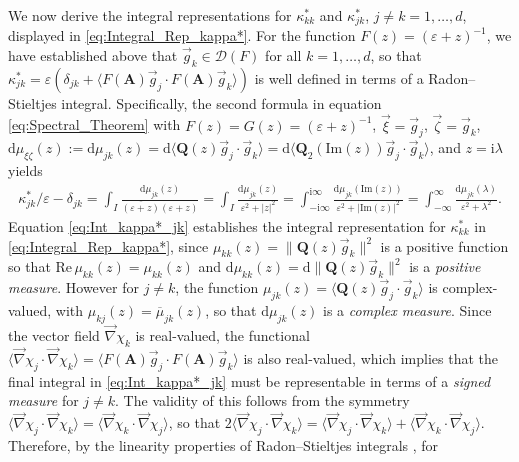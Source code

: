\documentclass[11pt]{amsart}
\newcommand{\I}{\mathrm{i}}
\renewcommand{\d}{\mathrm{d}}
\newcommand{\Ab}{\mathbf{A}}
\newcommand{\Qb}{\mathbf{Q}}
\newcommand{\Ds}{\mathscr{D}}
\begin{document}
We now derive the integral representations for $\kappa^*_{kk}$ and
$\kappa^*_{jk}$, $j\neq k=1,\ldots,d$, displayed in
\eqref{eq:Integral_Rep_kappa*}. For the function $F(z)=(\varepsilon+z)^{-1}$, we
have established above that $\vec{g}_k\in\Ds(F)$ for all
$k=1,\ldots,d$, so that
$\kappa^*_{jk}=\varepsilon(\delta_{jk}+\langle F(\Ab)\vec{g}_j\cdot F(\Ab)\vec{g}_k\rangle)$ is well defined
in terms of a Radon--Stieltjes integral. Specifically, the second
formula in equation \eqref{eq:Spectral_Theorem} with
$F(z)=G(z)=(\varepsilon+z)^{-1}$, $\vec{\xi}=\vec{g}_j$, $\vec{\zeta}=\vec{g}_k$,
$\d\mu_{\xi\zeta}(z):=\d\mu_{jk}(z)=\d\langle\Qb(z)\vec{g}_j\cdot\vec{g}_k\rangle
=\d\langle\Qb_2(\text{Im}(z))\vec{g}_j\cdot\vec{g}_k\rangle$, and $z=\I\lambda$
yields         
%
\begin{align}\label{eq:Int_kappa*_jk}
  \kappa^*_{jk}/\varepsilon-\delta_{jk}
               =\int_I\frac{\d\mu_{jk}(z)}{\overline{(\varepsilon+z)}(\varepsilon+z)}
               =\int_I\frac{\d\mu_{jk}(z)}{\varepsilon^2+|z|^2}
               =\int_{-\I\infty}^{\I\infty}\frac{\d\mu_{jk}(\text{Im}(z))}{\varepsilon^2+|\text{Im}(z)|^2}
               =\int_{-\infty}^\infty\frac{\d\mu_{jk}(\lambda)}{\varepsilon^2+\lambda^2}.
\end{align}
%
Equation \eqref{eq:Int_kappa*_jk} establishes the integral
representation for $\kappa^*_{kk}$ in \eqref{eq:Integral_Rep_kappa*}, since
$\mu_{kk}(z)=\|\Qb(z)\vec{g}_k\|^2$ is a positive function so that
$\text{Re}\,\mu_{kk}(z)=\mu_{kk}(z)$ and
$\d\mu_{kk}(z)=\d\|\Qb(z)\vec{g}_k\|^2$ is a \emph{positive 
  measure}. However for $j\neq k$, the function
$\mu_{jk}(z)=\langle\Qb(z)\vec{g}_j\cdot\vec{g}_k\rangle$ is complex-valued, with    
$\mu_{kj}(z)=\overline{\mu}_{jk}(z)$, so that $\d\mu_{jk}(z)$ is a
\emph{complex measure}. Since the vector field $\vec{\nabla}\chi_k$ is
real-valued, the 
functional $\langle\vec{\nabla}\chi_j\cdot\vec{\nabla}\chi_k\rangle=\langle F(\Ab)\vec{g}_j\cdot F(\Ab)\vec{g}_k\rangle$
is also real-valued, which implies that the final integral in
\eqref{eq:Int_kappa*_jk} must be representable in terms of a
\emph{signed measure} for $j\neq k$. The validity of this follows from the
symmetry $\langle\vec{\nabla}\chi_j\cdot\vec{\nabla}\chi_k\rangle=\langle\vec{\nabla}\chi_k\cdot\vec{\nabla}\chi_j\rangle$, so that
$2\langle\vec{\nabla}\chi_j\cdot\vec{\nabla}\chi_k\rangle=\langle\vec{\nabla}\chi_j\cdot\vec{\nabla}\chi_k\rangle+\langle\vec{\nabla}\chi_k\cdot\vec{\nabla}\chi_j\rangle$. Therefore,
by the linearity properties of Radon--Stieltjes integrals \cite{Stone:64}, for
\end{document}
